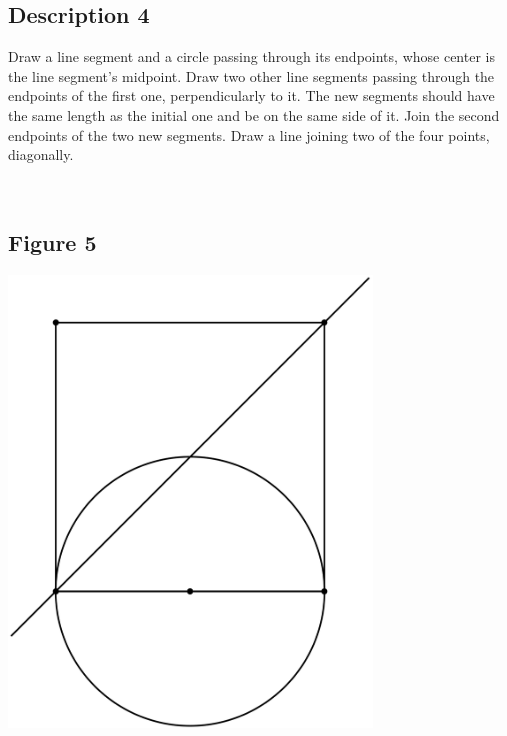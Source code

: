 \documentclass[12pt,a4paper,article,english,firamath]{nsi}
\begin{document}
\maketitle

\subsection*{Description 4}
{\brettley 

Draw a line segment and a circle passing through its endpoints, whose center is the line segment's midpoint.
Draw two other line segments passing through the endpoints of the first one, perpendicularly to it. The new segments should have the same length as the initial one and be on the same side of it. Join the second endpoints of the two new segments. Draw a line joining two of the four points, diagonally.}\\[1em]



\subsection*{Figure 5}
\begin{center}
    \includegraphics[height=12cm]{img/fig04.png}
\end{center}
\end{document}

